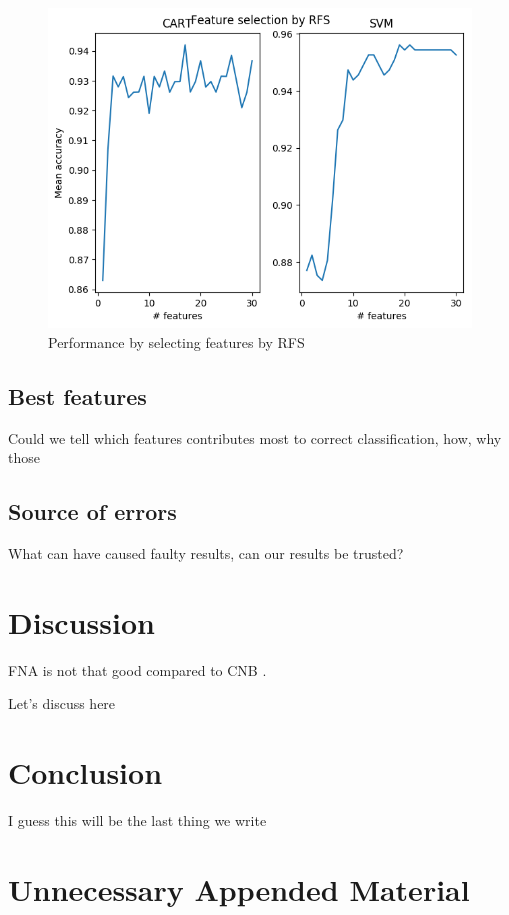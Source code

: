 \documentclass{kththesis}
\begin{document}
\begin{figure}[ht!]
  \includegraphics[width=\linewidth]{../plots/RFS.png}
  \caption{Performance by selecting features by RFS}
  \label{fig:rfs}
\end{figure}

\section{Best features}

Could we tell which features contributes most to correct classification, how, why those

\section{Source of errors}

What can have caused faulty results, can our results be trusted?

\chapter{Discussion}

FNA is not that good compared to CNB \parencite{Topps2018}.

Let's discuss here

\chapter{Conclusion}

I guess this will be the last thing we write

\printbibliography[heading=bibintoc] %

\appendix

\chapter{Unnecessary Appended Material}
\end{document}
